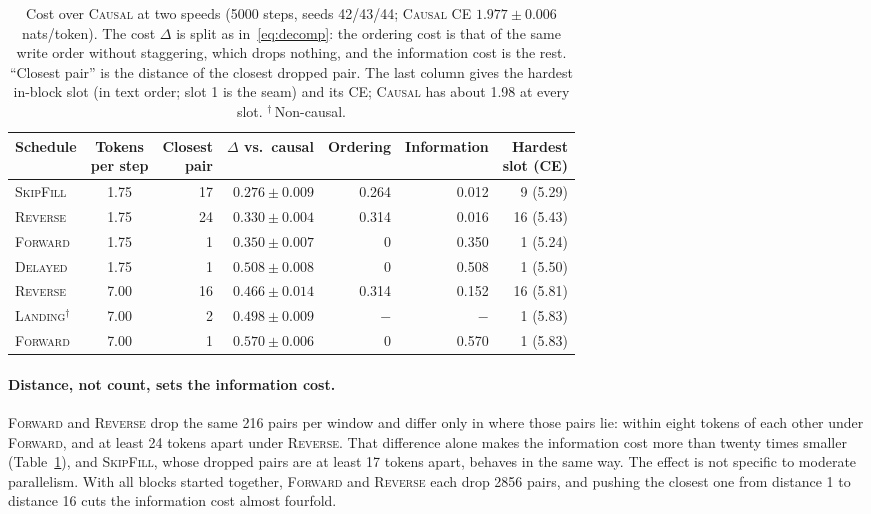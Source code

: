 \documentclass{article}
\theoremstyle{definition}
\theoremstyle{remark}
\newcommand{\name}[1]{\textup{\textsc{#1}}}
\newcommand{\sfill}{\name{SkipFill}\xspace}
\newcommand{\rev}{\name{Reverse}\xspace}
\newcommand{\fwd}{\name{Forward}\xspace}
\newcommand{\causal}{\name{Causal}\xspace}
\newcommand{\delayed}{\name{Delayed}\xspace}
\newcommand{\landing}{\name{Landing}\xspace}
\begin{document}
\begin{table}[t]
  \centering
  \caption{Cost over \causal at two speeds (5000 steps, seeds 42/43/44; \causal CE $1.977\pm0.006$ nats/token). The cost $\Delta$ is split as in~\eqref{eq:decomp}: the ordering cost is that of the same write order without staggering, which drops nothing, and the information cost is the rest. ``Closest pair'' is the distance of the closest dropped pair. The last column gives the hardest in-block slot (in text order; slot 1 is the seam) and its CE; \causal has about 1.98 at every slot. $^\dagger$\,Non-causal.}
  \label{tab:main}
  \small
  \setlength{\tabcolsep}{4.5pt}
  \begin{tabular}{lcrrrrr}
    \toprule
    Schedule & \makecell{Tokens\\per step} & \makecell{Closest\\pair} & $\Delta$ vs.\ causal & Ordering & Information & \makecell{Hardest\\slot (CE)} \\
    \midrule
    \sfill        & 1.75 & 17 & $\mathbf{0.276\pm0.009}$ & 0.264 & 0.012 & 9 (5.29) \\
    \rev          & 1.75 & 24 & $0.330\pm0.004$ & 0.314 & 0.016 & 16 (5.43) \\
    \fwd          & 1.75 & 1  & $0.350\pm0.007$ & 0     & 0.350 & 1 (5.24) \\
    \delayed      & 1.75 & 1  & $0.508\pm0.008$ & 0     & 0.508 & 1 (5.50) \\
    \midrule
    \rev          & 7.00 & 16 & $\mathbf{0.466\pm0.014}$ & 0.314 & 0.152 & 16 (5.81) \\
    \landing$^\dagger$ & 7.00 & 2 & $0.498\pm0.009$ & $-$ & $-$ & 1 (5.83) \\
    \fwd          & 7.00 & 1  & $0.570\pm0.006$ & 0     & 0.570 & 1 (5.83) \\
    \bottomrule
  \end{tabular}
\end{table}

\paragraph{Distance, not count, sets the information cost.}
\fwd and \rev drop the same 216 pairs per window and differ only in where those pairs lie: within eight tokens of each other under \fwd, and at least 24 tokens apart under \rev.
That difference alone makes the information cost more than twenty times smaller (Table~\ref{tab:main}), and \sfill, whose dropped pairs are at least 17 tokens apart, behaves in the same way.
The effect is not specific to moderate parallelism.
With all blocks started together, \fwd and \rev each drop 2856 pairs, and pushing the closest one from distance 1 to distance 16 cuts the information cost almost fourfold.
\end{document}
